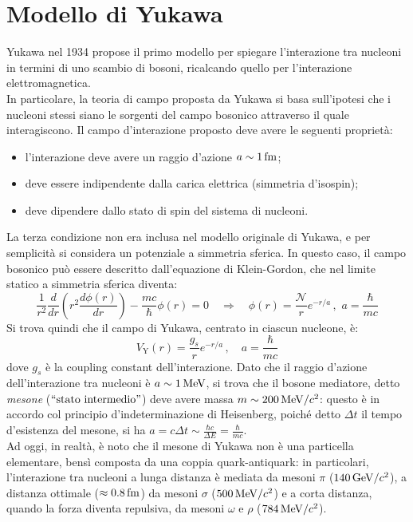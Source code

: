 
\section{Modello di Yukawa}

Yukawa nel 1934 propose il primo modello per spiegare l'interazione tra nucleoni in termini di uno scambio di bosoni, ricalcando quello per l'interazione elettromagnetica.\\
In particolare, la teoria di campo proposta da Yukawa si basa sull'ipotesi che i nucleoni stessi siano le sorgenti del campo bosonico attraverso il quale interagiscono. Il campo d'interazione proposto deve avere le seguenti proprietà:
\begin{itemize}
	\item l'interazione deve avere un raggio d'azione $ a \sim 1\,\mathrm{fm} $;
	\item deve essere indipendente dalla carica elettrica (simmetria d'isospin);
	\item deve dipendere dallo stato di spin del sistema di nucleoni.
\end{itemize}
La terza condizione non era inclusa nel modello originale di Yukawa, e per semplicità si considera un potenziale a simmetria sferica. In questo caso, il campo bosonico può essere descritto dall'equazione di Klein-Gordon, che nel limite statico a simmetria sferica diventa:
\begin{equation*}
	\frac{1}{r^2} \frac{d}{dr} \left( r^2 \frac{d\phi(r)}{dr} \right) - \frac{mc}{\hbar} \phi(r) = 0
	\quad \Rightarrow \quad
	\phi(r) = \frac{\mathcal{N}}{r} e^{- r / a}\,,\,\, a = \frac{\hbar}{mc}
\end{equation*}
Si trova quindi che il campo di Yukawa, centrato in ciascun nucleone, è:
\begin{equation}
	V_{\text{Y}}(r) = \frac{g_s}{r} e^{-r / a}\,,\quad a = \frac{\hbar}{mc}
	\label{eq:9.1}
\end{equation}
dove $ g_s $ è la coupling constant dell'interazione. Dato che il raggio d'azione dell'interazione tra nucleoni è $ a \sim 1\,\mathrm{MeV} $, si trova che il bosone mediatore, detto \textit{mesone} ($ ``\text{stato intermedio}" $) deve avere massa $ m \sim 200\,\mathrm{MeV}/c^2 $: questo è in accordo col principio d'indeterminazione di Heisenberg, poiché detto $ \Delta t $ il tempo d'esistenza del mesone, si ha $ a = c \Delta t \sim \frac{\hbar c}{\Delta E} = \frac{\hbar}{mc} $.\\
Ad oggi, in realtà, è noto che il mesone di Yukawa non è una particella elementare, bensì composta da una coppia quark-antiquark: in particolari, l'interazione tra nucleoni a lunga distanza è mediata da mesoni $ \pi $ ($ 140\,\mathrm{GeV}/c^2 $), a distanza ottimale ($ \approx 0.8\,\mathrm{fm} $) da mesoni $ \sigma $ ($ 500\,\mathrm{MeV}/c^2 $) e a corta distanza, quando la forza diventa repulsiva, da mesoni $ \omega $ e $ \rho $ ($ 784\,\mathrm{MeV}/c^2 $).\\
